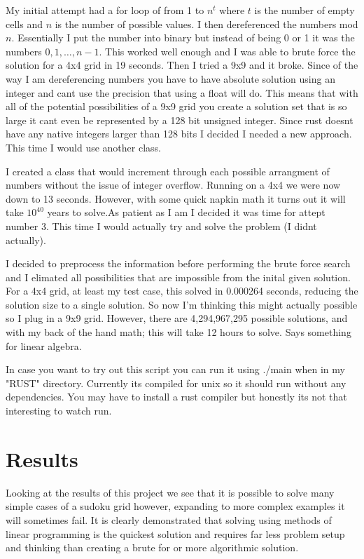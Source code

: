 \documentclass[12pt]{article}
\begin{document}
My initial attempt had a for loop of from 1 to $n^t$ where $t$ is the number of empty cells and 
$n$ is the number of possible values. I then dereferenced the numbers mod $n$. Essentially I put the number into binary but instead of being 0 or 1 it was the 
numbers $0,1,\hdots,n-1$. This worked well enough and I was able to brute force the solution for a 4x4 grid in 19 seconds. Then I tried a 9x9 and it broke. Since of the way
I am dereferencing numbers you have to have absolute solution using an integer and cant use the precision that using a float will do. This means that with all of the potential
possibilities of a 9x9 grid you create a solution set that is so large it cant even be represented by a 128 bit unsigned integer. Since rust doesnt have any native integers
larger than 128 bits I decided I needed a new approach. This time I would use another class. 

I created a class that would increment through each possible arrangment of numbers without the issue of integer overflow. Running on a 4x4 we were now down to 13 seconds. 
However, with some quick napkin math it turns out it will take $10^{40}$ years to solve.As patient as I am I decided it was time for attept number 3. 
This time I would actually try and solve the problem (I didnt actually). 

I decided to preprocess the information before performing the brute force search and I elimated all possibilities that are impossible from the inital given solution. 
For a 4x4 grid, at least my test case, this solved in 0.000264 seconds, reducing the solution size to a single solution. So now I'm thinking this might actually possible 
so I plug in a 9x9 grid. However, there are 4,294,967,295 possible solutions, and with my back of the hand math; 
this will take 12 hours to solve. Says something for linear algebra.
 
In case you want to try out this script you can run it using ./main when in my "RUST" directory. Currently its compiled for unix so it should run without any dependencies.
You may have to install a rust compiler but honestly its not that interesting to watch run.
\section{Results}
Looking at the results of this project we see that it is possible to solve many simple cases of a sudoku grid however, expanding to more complex examples it will sometimes fail.
It is clearly demonstrated that solving using methods of linear programming is the quickest solution and requires far less problem setup and thinking than creating 
a brute for or more algorithmic solution.
\end{document}
